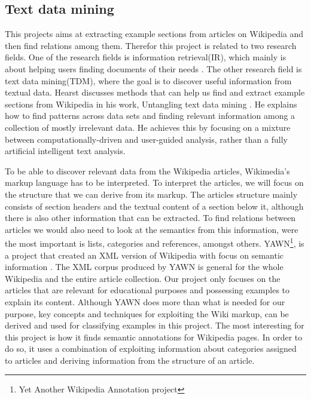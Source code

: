 \subsection{Text data mining} \label{sec_tdm}
This projects aims at extracting example sections from articles on Wikipedia and then find relations among them. Therefor this project is related to two research fields. One of the research fields is information retrieval(IR), which mainly is about helping users finding documents of their needs \cite{irbook}. The other research field is text data mining(TDM), where the goal is to discover useful information from textual data. Hearst discusses methods that can help us find and extract example sections from Wikipedia in his work, Untangling text data mining \cite{untanglingTDM}. He explains how to find patterns across data sets and finding relevant information among a collection of mostly irrelevant data. He achieves this by focusing on a mixture between computationally-driven and user-guided analysis, rather than a fully artificial intelligent text analysis.


To be able to discover relevant data from the Wikipedia articles, Wikimedia's markup language has to be interpreted.  To interpret the articles, we will focus on the structure that we can derive from its markup. The articles structure mainly consists of section headers and the textual content of a section below it, although there is also other information that can be extracted. To find relations between articles we would also need to look at the semantics from this information, were the most important is lists, categories and references, amongst others. YAWN\footnote{Yet Another Wikipedia Annotation project}, is a project that created an XML version of Wikipedia with focus on semantic information \cite{yawn}. The XML corpus produced by YAWN is general for the whole Wikipedia and the entire article collection. Our project only focuses on the articles that are relevant for educational purposes and possessing examples to explain its content. Although YAWN does more than what is needed for our purpose, key concepts and techniques for exploiting the Wiki markup, can be derived and used for classifying examples in this project. The most interesting for this project is how it finds semantic annotations for Wikipedia pages. In order to do so, it uses a combination of exploiting information about categories assigned to articles and deriving information from the structure of an article.

